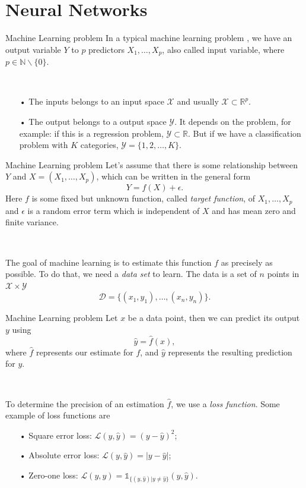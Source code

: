 \documentclass[11pt]{beamer}
\begin{document}
\section{Neural Networks}
\begin{frame}{Machine Learning problem}
In a typical machine learning problem \cite{10}, we have an output variable $Y$ to $p$ predictors $X_1,\dots, X_p$, also called input variable, where $p\in \mathbb{N}\backslash \{0\}$. 

~
\begin{itemize}
\item[•] The inputs belongs to an input space $\mathcal{X}$ and usually $\mathcal{X} \subset \mathbb{R}^p$. 

\item[•] The output belongs to a output space $\mathcal{Y}$. It depends on the problem, for example: if this is a regression problem, $\mathcal{Y} \subset \mathbb{R}$. But if we have a classification problem with $K$ categories, $\mathcal{Y} = \{1,2,\dots, K\}$.
\end{itemize}


\end{frame}

\begin{frame}{Machine Learning problem}
Let's assume that there is some relationship between $Y$ and $X = (X_1,\dots, X_p)$, which can be written in the general form
$$
Y = f(X) + \epsilon.
$$
Here $f$ is some fixed but unknown function, called \textit{target function}, of $X_1, \dots, X_p$ and $\epsilon$ is a random error term which is independent of $X$ and has mean zero and finite variance.

~

The goal of machine learning is to estimate this function $f$ as precisely as possible. To do that, we need a \textit{data set} to learn. The data is a set of $n$ points in $\mathcal{X} \times \mathcal{Y}$
$$
\mathcal{D} = \{(x_1, y_1),\dots, (x_n,y_n)\}.
$$
\end{frame}

\begin{frame}{Machine Learning problem}
Let $x$ be a data point, then we can predict its output $y$ using 
$$
\hat{y} = \hat{f}(x),
$$
where $\hat{f}$ represents our estimate for $f$, and $\hat{y}$ represents the resulting prediction for $y$.

~

To determine the precision of an estimation $\hat{f}$, we use a \textit{loss function}. Some example of loss functions are
\begin{itemize}
\item[•] Square error loss: $\mathcal{L}(y, \hat{y}) = (y-\hat{y})^2$;
\item[•] Absolute error loss: $\mathcal{L}(y, \hat{y}) = |y - \hat{y}|$;
\item[•] Zero-one loss: $\mathcal{L}(y, \hat{y}) = \mathds{1}_{\{(y, \hat{y}) | y\neq \hat{y}\}}(y, \hat{y})$.
\end{itemize}
\end{frame}
\end{document}

